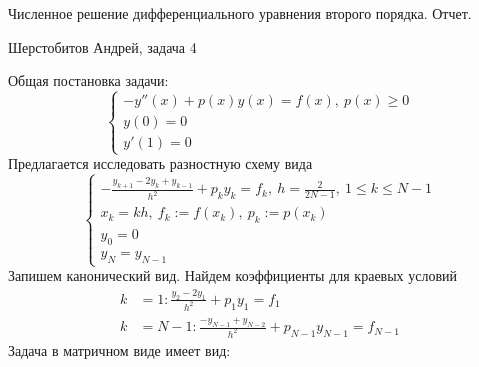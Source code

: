 \documentclass[12pt]{article}
\begin{document}
    \begin{center}
    Численное решение дифференциального уравнения второго порядка. Отчет.
    \end{center}
    \begin{center}
    Шерстобитов Андрей, задача 4
    \end{center}
    Общая постановка задачи:
    \[\begin{cases}
        -y''(x) +p(x)y(x) = f(x),\ p(x) \geq 0\\
        y(0) = 0 \\
        y'(1) = 0
    \end{cases}\]
    Предлагается исследовать разностную схему вида
    \[\begin{cases}
        -\frac{y_{k+1}-2y_k+y_{k-1}}{h^2}+p_ky_k = f_k,\ h = \frac{2}{2N-1},\ 1 \leq k \leq N-1 \\
        x_k = kh,\ f_k := f(x_k),\ p_k := p(x_k) \\
        y_0 = 0 \\
        y_N = y_{N-1}
    \end{cases}\]
    Запишем канонический вид. Найдем коэффициенты для краевых условий
    \begin{align*}
        k &= 1: \frac{y_2 - 2y_1}{h^2} + p_1y_1= f_1 \\
        k &= N-1: \frac{-y_{N-1} + y_{N-2}}{h^2} + p_{N-1} y_{N-1} = f_{N-1}
    \end{align*}
    Задача в матричном виде имеет вид:
\end{document}

